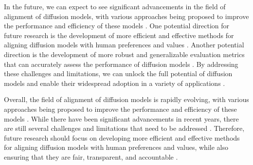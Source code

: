 \documentclass[11pt,a4paper]{article}
\begin{document}
In the future, we can expect to see significant advancements in the field of alignment of diffusion models, with various approaches being proposed to improve the performance and efficiency of these models \cite{arxiv:2505.22165}. One potential direction for future research is the development of more efficient and effective methods for aligning diffusion models with human preferences and values \cite{arxiv:2601.04300}. Another potential direction is the development of more robust and generalizable evaluation metrics that can accurately assess the performance of diffusion models \cite{arxiv:2408.10207}. By addressing these challenges and limitations, we can unlock the full potential of diffusion models and enable their widespread adoption in a variety of applications \cite{arxiv:2502.09935}. 

Overall, the field of alignment of diffusion models is rapidly evolving, with various approaches being proposed to improve the performance and efficiency of these models \cite{arxiv:2502.08914}. While there have been significant advancements in recent years, there are still several challenges and limitations that need to be addressed \cite{arxiv:2402.07487}. Therefore, future research should focus on developing more efficient and effective methods for aligning diffusion models with human preferences and values, while also ensuring that they are fair, transparent, and accountable \cite{arxiv:2503.05149}.
\end{document}
